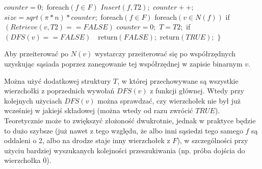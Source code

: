 \documentclass{pracamgr}
\begin{document}
    \hspace*{116pt}	$counter=0;$\newline
    \hspace*{116pt}	foreach$(f\in F)$\newline
    \hspace*{132pt}		$Insert(f,T2);$\newline
    \hspace*{132pt}		$counter++;$\newline
    \hspace*{116pt}	$size=sqrt(\pi*n)*counter;$\newline
    \hspace*{116pt}	foreach$(f\in F)$\newline
    \hspace*{132pt}		foreach$(v\in N(f))$\newline
    \hspace*{148pt}			if$(Retrieve(v,T2)==FALSE)$\newline
    \hspace*{164pt}				$counter=0;$\newline
    \hspace*{164pt}				$T=T2;$\newline
    \hspace*{164pt}				if$(DFS(v)==FALSE)\quad $return$(FALSE);$\newline
    \hspace*{116pt}	return$(TRUE);$\newline
    \hspace*{100pt}$\}$\newline
    
     Aby przeiterować po $N(v)$ wystarczy przeiterować się po współrzędnych uzyskując sąsiada poprzez zanegowanie tej współrzędnej w zapisie binarnym $v$.
     
     Można użyć dodatkowej struktury $T$, w której przechowywane są wszystkie wierzchołki z poprzednich wywołań $DFS(v)$ z funkcji głównej.
     Wtedy przy kolejnych użyciach $DFS(v)$ można sprawdzać, czy wierzchołek nie był już wcześniej w jakiejś składowej (można wtedy od razu zwrócić $TRUE$).
     Teoretycznie może to zwiększyć złożoność dwukrotnie, jednak w praktyce będzie to dużo szybsze
     (już nawet z tego względu, że albo inni sąsiedzi tego samego $f$ są oddaleni o 2, albo na drodze staje inny wierzchołek z $F$),
     w szczególności przy użyciu bardziej wyszukanych kolejności przeszukiwania (np. próba dojścia do wierzchołka $\overline{0}$).
     
\end{document}
